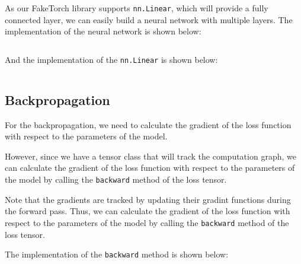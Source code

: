As our FakeTorch library supports \texttt{nn.Linear}, which will provide a fully connected layer, we can easily build a neural network with multiple layers. The implementation of the neural network is shown below:

\inputminted[firstline=4, lastline=24]{python}{../model.py}

And the implementation of the \texttt{nn.Linear} is shown below:

\inputminted[firstline=6, lastline=17]{python}{../FakeTorch/nn/linear.py}


\subsection{Backpropagation}


For the backpropagation, we need to calculate the gradient of the loss function with respect to the parameters of the model.

However, since we have a tensor class that will track the computation graph, we can calculate the gradient of the loss function with respect to the parameters of the model by calling the \texttt{backward} method of the loss tensor.

Note that the gradients are tracked by updating their gradint functions during the forward pass. Thus, we can calculate the gradient of the loss function with respect to the parameters of the model by calling the \texttt{backward} method of the loss tensor.

The implementation of the \texttt{backward} method is shown below:

\inputminted[firstline=14, lastline=34]{python}{../FakeTorch/Tensor.py}
